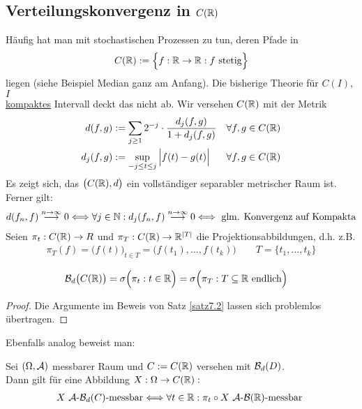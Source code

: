 \subsection{Verteilungskonvergenz in \texorpdfstring{$C(\mathbb{R})$}{C(R)}}
Häufig hat man mit stochastischen Prozessen zu tun, deren Pfade in
\begin{align*}
	C(\mathbb{R}):=\Big\lbrace f:\mathbb{R}\to\mathbb{R}:f\text{ stetig}\Big\rbrace
\end{align*}
liegen (siehe Beispiel Median ganz am Anfang). Die bisherige Theorie für $C(I)$, $I$\\ \underline{kompaktes} Intervall deckt das nicht ab. Wir versehen $C(\mathbb{R})$ mit der Metrik
\begin{align*}
	d(f,g)&:=\sum\limits_{j\geq 1} 2^{-j}\cdot\frac{d_j(f,g)}{1+d_j(f,g)} &\forall f,g\in C(\mathbb{R})\\
	d_j(f,g)&:=\sup\limits_{-j\leq t\leq j}\Big|f(t)-g(t)\Big| &\forall f,g\in C(\mathbb{R})
\end{align*}
Es zeigt sich, das $\big(C(\mathbb{R}),d\big)$ ein vollständiger separabler metrischer Raum ist. Ferner gilt:
\begin{align*}
	d(f_n,f)\stackrel{n\to\infty}{\longrightarrow}0
	\Longleftrightarrow \forall j\in\mathbb{N}: d_j(f_n,f)\stackrel{n\to\infty}{\longrightarrow}0
	\Longleftrightarrow\text{ glm. Konvergenz auf Kompakta}
\end{align*}
Seien $\pi_t:C(\mathbb{R})\to R$ und $\pi_T:C(\mathbb{R})\to\mathbb{R}^{|T|}$ die Projektionsabbildungen, d.h. z.B.
\begin{align*}
	\pi_T(f)=\big(f(t)\big)_{t\in T}=\Big(f(t_1),\ldots,f(t_k)\Big)\qquad
	T=\lbrace t_1,\ldots, t_k\rbrace
\end{align*}

\begin{theorem}\label{theorem7.20}
	\begin{align*}
		\mathcal{B}_d\big(C(\mathbb{R})\big)&=\sigma\Big(\pi_t:t\in\mathbb{R}\Big)=\sigma\Big(\pi_T:T\subseteq\mathbb{R}\text{ endlich}\Big)
	\end{align*}
\end{theorem}

\begin{proof}
	Die Argumente im Beweis von Satz \ref{satz7.2} lassen sich problemlos übertragen.
\end{proof}

Ebenfalls analog beweist man:

\begin{satz}\label{satz7.21}
	 Sei $(\Omega,\mathcal{A})$ messbarer Raum und $C:=C(\mathbb{R})$ versehen mit $\mathcal{B}_d(D)$.\\
	 Dann gilt für eine Abbildung $X:\Omega\to C(\mathbb{R}):$
	 \begin{align*}
	 	X~\mathcal{A}\text{-}\mathcal{B}_d(C)\text{-messbar}
	 	\Longleftrightarrow\forall t\in\mathbb{R}:
	 	\pi_t\circ X~\mathcal{A}\text{-}\mathcal{B}(\mathbb{R})\text{-messbar }
	 \end{align*}
\end{satz}

